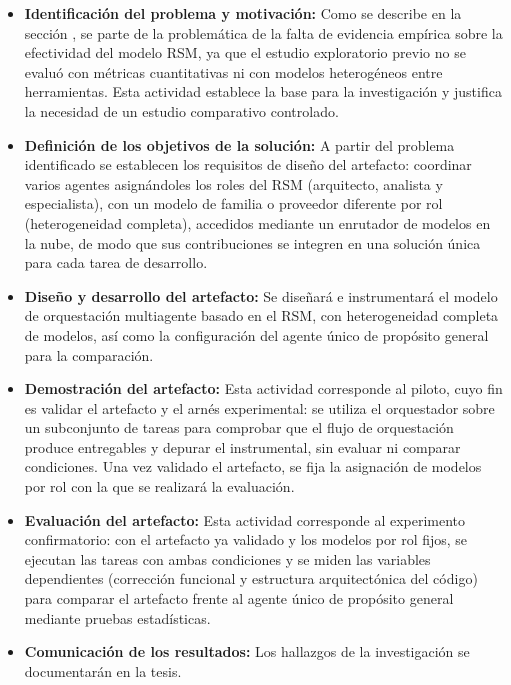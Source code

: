 \begin{itemize}
  \item \textbf{Identificación del problema y motivación:} Como se describe en la sección , se parte de la problemática de la falta de evidencia empírica sobre la efectividad del modelo RSM, ya que el estudio exploratorio previo \parencite{fernandezyfernandez2026rsm} no se evaluó con métricas cuantitativas ni con modelos heterogéneos entre herramientas. Esta actividad establece la base para la investigación y justifica la necesidad de un estudio comparativo controlado.
  \item \textbf{Definición de los objetivos de la solución:} A partir del problema identificado se establecen los requisitos de diseño del artefacto: coordinar varios agentes asignándoles los roles del RSM (arquitecto, analista y especialista), con un modelo de familia o proveedor diferente por rol (heterogeneidad completa), accedidos mediante un enrutador de modelos en la nube, de modo que sus contribuciones se integren en una solución única para cada tarea de desarrollo.
  \item \textbf{Diseño y desarrollo del artefacto:} Se diseñará e instrumentará el modelo de orquestación multiagente basado en el RSM, con heterogeneidad completa de modelos, así como la configuración del agente único de propósito general para la comparación.
  \item \textbf{Demostración del artefacto:} Esta actividad corresponde al piloto, cuyo fin es validar el artefacto y el arnés experimental: se utiliza el orquestador sobre un subconjunto de tareas para comprobar que el flujo de orquestación produce entregables y depurar el instrumental, sin evaluar ni comparar condiciones. Una vez validado el artefacto, se fija la asignación de modelos por rol con la que se realizará la evaluación.
  \item \textbf{Evaluación del artefacto:} Esta actividad corresponde al experimento confirmatorio: con el artefacto ya validado y los modelos por rol fijos, se ejecutan las tareas con ambas condiciones y se miden las variables dependientes (corrección funcional y estructura arquitectónica del código) para comparar el artefacto frente al agente único de propósito general mediante pruebas estadísticas.
  \item \textbf{Comunicación de los resultados:} Los hallazgos de la investigación se documentarán en la tesis.
\end{itemize}

